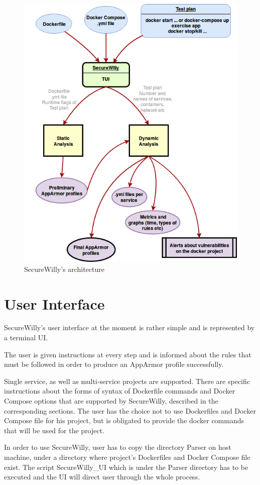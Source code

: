 \begin{figure}[h!]
   \centering
   \includegraphics[width=0.8\linewidth]{figures/SecureWilly.png}
   \caption{SecureWilly's architecture}
\end{figure}

\section{User Interface}

SecureWilly's user interface at the moment is rather simple and is represented by a terminal UI.

The user is given instructions at every step and is informed about the rules that must be followed in order to produce an AppArmor profile successfully.

Single service, as well as multi-service projects are supported. There are specific instructions about the forms of syntax of Dockerfile commands and Docker Compose options that are supported by SecureWilly, described in the corresponding sections. The user has the choice not to use Dockerfiles and Docker Compose file for his project, but is obligated to provide the docker commands that will be used for the project.

In order to use SecureWilly, user has to copy the directory Parser on host machine, under a directory where project's Dockerfiles and Docker Compose file exist. The script SecureWilly\_UI which is under the Parser directory has to be executed and the UI will direct user through the whole process.

